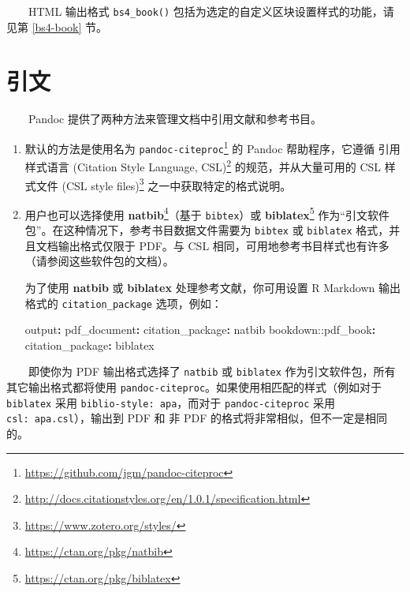 \documentclass[
  12pt,
]{krantz}
\newenvironment{Shaded}{\begin{snugshade}}{\end{snugshade}}
\newcommand{\AttributeTok}[1]{\textcolor[rgb]{0.77,0.63,0.00}{#1}}
\newcommand{\FunctionTok}[1]{\textcolor[rgb]{0.00,0.00,0.00}{#1}}
\newcommand{\KeywordTok}[1]{\textcolor[rgb]{0.13,0.29,0.53}{\textbf{#1}}}
\renewcommand{\href}[2]{#2\footnote{\url{#1}}}
\theoremstyle{definition}
\theoremstyle{definition}
\theoremstyle{definition}
\theoremstyle{definition}
\theoremstyle{remark}
\begin{document}
  HTML 输出格式 \texttt{bs4\_book()} 包括为选定的自定义区块设置样式的功能，请见第 \ref{bs4-book} 节。

\hypertarget{citations}{%
\section{引文}\label{citations}}

  Pandoc 提供了两种方法来管理文档中引用文献和参考书目。

\begin{enumerate}
\def\labelenumi{\arabic{enumi}.}
\item
  默认的方法是使用名为 \href{https://github.com/jgm/pandoc-citeproc}{\texttt{pandoc-citeproc}} 的 Pandoc 帮助程序，它遵循 \href{http://docs.citationstyles.org/en/1.0.1/specification.html}{引用样式语言 (Citation Style Language, CSL)} 的规范，并从大量可用的 \href{https://www.zotero.org/styles/}{CSL 样式文件 (CSL style files)} 之一中获取特定的格式说明。
\item
  用户也可以选择使用 \href{https://ctan.org/pkg/natbib}{\textbf{natbib}}（基于 \texttt{bibtex}）或 \href{https://ctan.org/pkg/biblatex}{\textbf{biblatex}} 作为``引文软件包''。在这种情况下，参考书目数据文件需要为 \texttt{bibtex} 或 \texttt{biblatex} 格式，并且文档输出格式仅限于 PDF。与 CSL 相同，可用地参考书目样式也有许多（请参阅这些软件包的文档）。

  为了使用 \textbf{natbib} 或 \textbf{biblatex} 处理参考文献，你可用设置 R Markdown 输出格式的 \texttt{citation\_package} 选项，例如：

\begin{Shaded}
\begin{Highlighting}[]
\FunctionTok{output}\KeywordTok{:}
\AttributeTok{  }\FunctionTok{pdf\_document}\KeywordTok{:}
\AttributeTok{    }\FunctionTok{citation\_package}\KeywordTok{:}\AttributeTok{ natbib}
\AttributeTok{  bookdown:}\FunctionTok{:pdf\_book}\KeywordTok{:}
\AttributeTok{    }\FunctionTok{citation\_package}\KeywordTok{:}\AttributeTok{ biblatex}
\end{Highlighting}
\end{Shaded}
\end{enumerate}

  即使你为 PDF 输出格式选择了 \texttt{natbib} 或 \texttt{biblatex} 作为引文软件包，所有其它输出格式都将使用 \texttt{pandoc-citeproc}。如果使用相匹配的样式（例如对于 \texttt{biblatex} 采用 \texttt{biblio-style:\ apa}，而对于 \texttt{pandoc-citeproc} 采用 \texttt{csl:\ apa.csl}），输出到 PDF 和 非 PDF 的格式将非常相似，但不一定是相同的。
\end{document}
